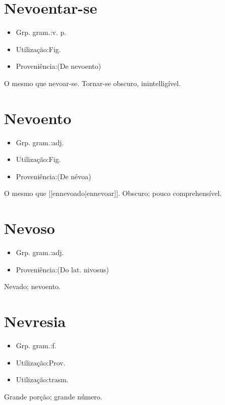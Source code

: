 \section{Nevoentar-se}
\begin{itemize}
\item {Grp. gram.:v. p.}
\end{itemize}
\begin{itemize}
\item {Utilização:Fig.}
\end{itemize}
\begin{itemize}
\item {Proveniência:(De \textunderscore nevoento\textunderscore )}
\end{itemize}
O mesmo que \textunderscore nevoar-se\textunderscore .
Tornar-se obscuro, inintelligível.
\section{Nevoento}
\begin{itemize}
\item {Grp. gram.:adj.}
\end{itemize}
\begin{itemize}
\item {Utilização:Fig.}
\end{itemize}
\begin{itemize}
\item {Proveniência:(De \textunderscore névoa\textunderscore )}
\end{itemize}
O mesmo que [[ennevoado|ennevoar]].
Obscuro; pouco comprehensível.
\section{Nevoso}
\begin{itemize}
\item {Grp. gram.:adj.}
\end{itemize}
\begin{itemize}
\item {Proveniência:(Do lat. \textunderscore nivosus\textunderscore )}
\end{itemize}
Nevado; nevoento.
\section{Nevresia}
\begin{itemize}
\item {Grp. gram.:f.}
\end{itemize}
\begin{itemize}
\item {Utilização:Prov.}
\end{itemize}
\begin{itemize}
\item {Utilização:trasm.}
\end{itemize}
Grande porção; grande número.
